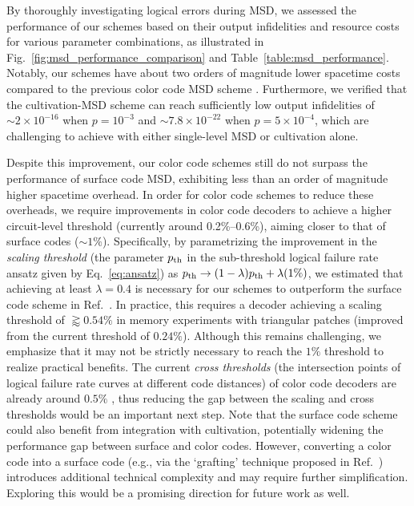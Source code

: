 \documentclass[
 prx,
 reprint,
 superscriptaddress,
 longbibliography,
 dvipsnames
]{revtex4-2}
\begin{document}
By thoroughly investigating logical errors during MSD, we assessed the performance of our schemes based on their output infidelities and resource costs for various parameter combinations, as illustrated in Fig.~\ref{fig:msd_performance_comparison} and Table~\ref{table:msd_performance}. 
Notably, our schemes have about two orders of magnitude lower spacetime costs compared to the previous color code MSD scheme \cite{beverland2021cost}.
Furthermore, we verified that the cultivation-MSD scheme can reach sufficiently low output infidelities of $\sim 2 \times 10^{-16}$ when $p=10^{-3}$ and $\sim 7.8 \times 10^{-22}$ when $p=5 \times 10^{-4}$, which are challenging to achieve with either single-level MSD or cultivation alone.

\label{para:despitethisimprovement}
Despite this improvement, our color code schemes still do not surpass the performance of surface code MSD, exhibiting less than an order of magnitude higher spacetime overhead.
In order for color code schemes to reduce these overheads, we require improvements in color code decoders to achieve a higher circuit-level threshold (currently around 0.2\%--0.6\%), aiming closer to that of surface codes ($\sim 1\%$).
Specifically, by parametrizing the improvement in the \textit{scaling threshold} (the parameter $p_{\mathrm{th}}$ in the sub-threshold logical failure rate ansatz given by Eq.~\eqref{eq:ansatz}) as $p_{\mathrm{th}} \rightarrow (1 - \lambda) p_{\mathrm{th}} + \lambda (1\%)$, we estimated that achieving at least $\lambda = 0.4$ is necessary for our schemes to outperform the surface code scheme in Ref.~\cite{litinski2019magic}.
In practice, this requires a decoder achieving a scaling threshold of $\gtrapprox 0.54\%$ in memory experiments with triangular patches (improved from the current threshold of $0.24\%$).
Although this remains challenging, we emphasize that it may not be strictly necessary to reach the $1\%$ threshold to realize practical benefits.
The current \textit{cross thresholds} (the intersection points of logical failure rate curves at different code distances) of color code decoders are already around $0.5\%$ \cite{beverland2021cost,gidney2023new,zhang2024facilitating,lee2025color}, thus reducing the gap between the scaling and cross thresholds would be an important next step.
Note that the surface code scheme could also benefit from integration with cultivation, potentially widening the performance gap between surface and color codes.
However, converting a color code into a surface code (e.g., via the `grafting' technique proposed in Ref.~\cite{gidney2024magic}) introduces additional technical complexity and may require further simplification.
Exploring this would be a promising direction for future work as well.
\end{document}
